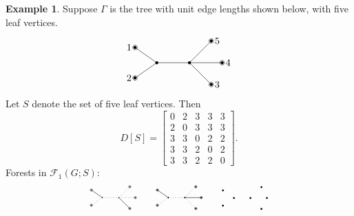 \documentclass{amsart}
\theoremstyle{definition}
\newtheorem{eg}[thm]{Example}
\newcommand{\trees}{\mathcal{F}_1}
\begin{document}
\begin{eg}
Suppose $\Gamma$ is the tree with unit edge lengths shown below, with five leaf vertices.
\[
\begin{tikzpicture}[scale=0.8]
	\coordinate (1) at (-2,0.7);
	\coordinate (2) at (-2,-0.7);
	\coordinate (3) at (1.5,-1);
	\coordinate (4) at (2,0);
	\coordinate (5) at (1.5,1);
	\coordinate (A) at (-1,0);
	\coordinate (B) at (0.5,0);
	
	\foreach \c in {1,2,3,4,5,A,B} {
		\fill (\c) circle (2pt);
	}
	\foreach \c in {1,2,3,4,5} {
		\draw (\c) circle (3pt);
	}

	\draw (A) -- (1);
	\draw (A) -- (2);
	\draw (B) -- (3);
	\draw (B) -- (4);
	\draw (B) -- (5);
	\draw (A) -- (B);
	
	\foreach \c/\d in {1/left,2/left,3/right,4/right,5/right} {
		\node[\d=0.2] at (\c) {$\c$};
	}
\end{tikzpicture}
\]
Let $S$ denote the set of five leaf vertices. Then
$$
D[S] = \begin{bmatrix}
0 & 2 & 3 & 3 & 3 \\
2 & 0 & 3 & 3 & 3 \\
3 & 3 & 0 & 2 & 2 \\
3 & 3 & 2 & 0 & 2 \\
3 & 3 & 2 & 2 & 0
\end{bmatrix}.
$$
Forests in $\trees(G;S)$:
\[
\begin{tikzpicture}[scale=0.4]
	\coordinate (1) at (-2,0.7);
	\coordinate (2) at (-2,-0.7);
	\coordinate (3) at (1.5,-1);
	\coordinate (4) at (2,0);
	\coordinate (5) at (1.5,1);
	\coordinate (A) at (-1,0);
	\coordinate (B) at (0.5,0);
	
	\foreach \c in {1,2,3,4,5,A,B} {
		\fill (\c) circle (1.5pt);
	}
	\foreach \c in {1,2,3,4,5} {
		\draw (\c) circle (3pt);
	}

	\draw (A) -- (1);
	\draw[dotted] (A) -- (2);
	\draw (B) -- (3);
	\draw[dotted] (B) -- (4);
	\draw[dotted] (B) -- (5);
	\draw[dotted] (A) -- (B);
\end{tikzpicture}
\qquad
\begin{tikzpicture}[scale=0.4]
	\coordinate (1) at (-2,0.7);
	\coordinate (2) at (-2,-0.7);
	\coordinate (3) at (1.5,-1);
	\coordinate (4) at (2,0);
	\coordinate (5) at (1.5,1);
	\coordinate (A) at (-1,0);
	\coordinate (B) at (0.5,0);
	
	\foreach \c in {1,2,3,4,5,A,B} {
		\fill (\c) circle (1.8pt);
	}
	\foreach \c in {1,2,3,4,5} {
		\draw (\c) circle (3pt);
	}

	\draw (A) -- (1);
	\draw[dotted] (A) -- (2);
	\draw[dotted] (B) -- (3);
	\draw (B) -- (4);
	\draw[dotted] (B) -- (5);
	\draw[dotted] (A) -- (B);
\end{tikzpicture}
\qquad
\begin{tikzpicture}[scale=0.4]
	\filldraw[black] (-2,0.7) coordinate (1) circle (2pt);
	\filldraw[black] (-2,-0.7) coordinate (2) circle (2pt);
	\filldraw[black] (1.5,-1) coordinate (3) circle (2pt);
	\filldraw[black] (2,0) coordinate (4) circle (2pt);
	\filldraw[black] (1.5,1) coordinate (5) circle (2pt);
	\filldraw[black] (-1,0) coordinate (A) circle (2pt);
	\filldraw[black] (0.5,0) coordinate (B) circle (2pt);


\end{tikzpicture}\]
\end{eg}
\end{document}
